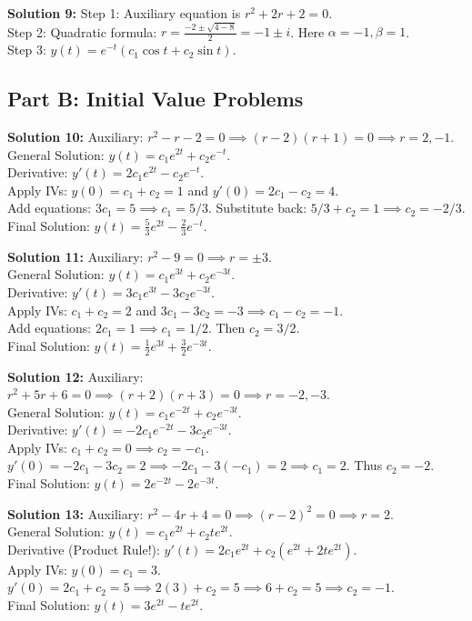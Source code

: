 \documentclass[11pt]{article}
\begin{document}
\textbf{Solution 9:} 
Step 1: Auxiliary equation is $r^2 + 2r + 2 = 0$. \\
Step 2: Quadratic formula: $r = \frac{-2 \pm \sqrt{4 - 8}}{2} = -1 \pm i$. Here $\alpha = -1, \beta = 1$. \\
Step 3: $y(t) = e^{-t}(c_1\cos t + c_2\sin t)$.

\subsection*{Part B: Initial Value Problems}

\textbf{Solution 10:} 
Auxiliary: $r^2 - r - 2 = 0 \implies (r - 2)(r + 1) = 0 \implies r = 2, -1$. \\
General Solution: $y(t) = c_1e^{2t} + c_2e^{-t}$. \\
Derivative: $y'(t) = 2c_1e^{2t} - c_2e^{-t}$. \\
Apply IVs: $y(0) = c_1 + c_2 = 1$ and $y'(0) = 2c_1 - c_2 = 4$. \\
Add equations: $3c_1 = 5 \implies c_1 = 5/3$. Substitute back: $5/3 + c_2 = 1 \implies c_2 = -2/3$. \\
Final Solution: $y(t) = \frac{5}{3}e^{2t} - \frac{2}{3}e^{-t}$.

\textbf{Solution 11:} 
Auxiliary: $r^2 - 9 = 0 \implies r = \pm 3$. \\
General Solution: $y(t) = c_1e^{3t} + c_2e^{-3t}$. \\
Derivative: $y'(t) = 3c_1e^{3t} - 3c_2e^{-3t}$. \\
Apply IVs: $c_1 + c_2 = 2$ and $3c_1 - 3c_2 = -3 \implies c_1 - c_2 = -1$. \\
Add equations: $2c_1 = 1 \implies c_1 = 1/2$. Then $c_2 = 3/2$. \\
Final Solution: $y(t) = \frac{1}{2}e^{3t} + \frac{3}{2}e^{-3t}$.

\textbf{Solution 12:} 
Auxiliary: $r^2 + 5r + 6 = 0 \implies (r + 2)(r + 3) = 0 \implies r = -2, -3$. \\
General Solution: $y(t) = c_1e^{-2t} + c_2e^{-3t}$. \\
Derivative: $y'(t) = -2c_1e^{-2t} - 3c_2e^{-3t}$. \\
Apply IVs: $c_1 + c_2 = 0 \implies c_2 = -c_1$. \\
$y'(0) = -2c_1 - 3c_2 = 2 \implies -2c_1 - 3(-c_1) = 2 \implies c_1 = 2$. Thus $c_2 = -2$. \\
Final Solution: $y(t) = 2e^{-2t} - 2e^{-3t}$.

\textbf{Solution 13:} 
Auxiliary: $r^2 - 4r + 4 = 0 \implies (r - 2)^2 = 0 \implies r = 2$. \\
General Solution: $y(t) = c_1e^{2t} + c_2te^{2t}$. \\
Derivative (Product Rule!): $y'(t) = 2c_1e^{2t} + c_2(e^{2t} + 2te^{2t})$. \\
Apply IVs: $y(0) = c_1 = 3$. \\
$y'(0) = 2c_1 + c_2 = 5 \implies 2(3) + c_2 = 5 \implies 6 + c_2 = 5 \implies c_2 = -1$. \\
Final Solution: $y(t) = 3e^{2t} - te^{2t}$.
\end{document}
